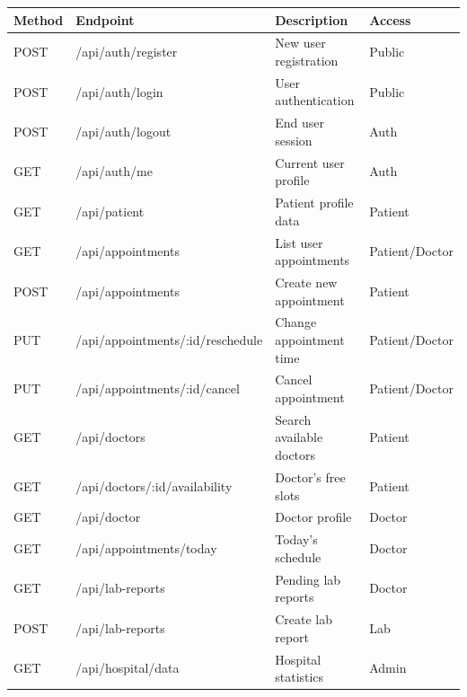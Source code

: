 \begin{table}[H]
    \small
    \centering
    \renewcommand{\arraystretch}{1.3}
    \begin{tabular}{|>{\raggedright\arraybackslash}p{1.6cm}|>{\raggedright\arraybackslash}p{5.1cm}|>{\raggedright\arraybackslash}p{4.2cm}|>{\raggedright\arraybackslash}p{2.9cm}|}
        \hline
        \textbf{Method} & \textbf{Endpoint} & \textbf{Description} & \textbf{Access} \\
        \hline
        POST & /api/auth/register & New user registration & Public \\
        \hline
        POST & /api/auth/login & User authentication & Public \\
        \hline
        POST & /api/auth/logout & End user session & Auth \\
        \hline
        GET  & /api/auth/me & Current user profile & Auth \\
        \hline
        GET  & /api/patient & Patient profile data & Patient \\
        \hline
        GET  & /api/appointments & List user appointments & Patient/\allowbreak{}Doctor \\
        \hline
        POST & /api/appointments & Create new appointment & Patient \\
        \hline
        PUT  & /api/appointments/\allowbreak:id/\allowbreak reschedule & Change appointment time & Patient/\allowbreak{}Doctor \\
        \hline
        PUT  & /api/appointments/\allowbreak:id/\allowbreak cancel & Cancel appointment & Patient/\allowbreak{}Doctor \\
        \hline
        GET  & /api/doctors & Search available doctors & Patient \\
        \hline
        GET  & /api/doctors/\allowbreak:id/\allowbreak availability & Doctor's free slots & Patient \\
        \hline
        GET  & /api/doctor & Doctor profile & Doctor \\
        \hline
        GET  & /api/appointments/today & Today's schedule & Doctor \\
        \hline
        GET  & /api/lab-reports & Pending lab reports & Doctor \\
        \hline
        POST & /api/lab-reports & Create lab report & Lab \\
        \hline
        GET  & /api/hospital/data & Hospital statistics & Admin \\
        \hline

\end{tabular}
\end{table}
